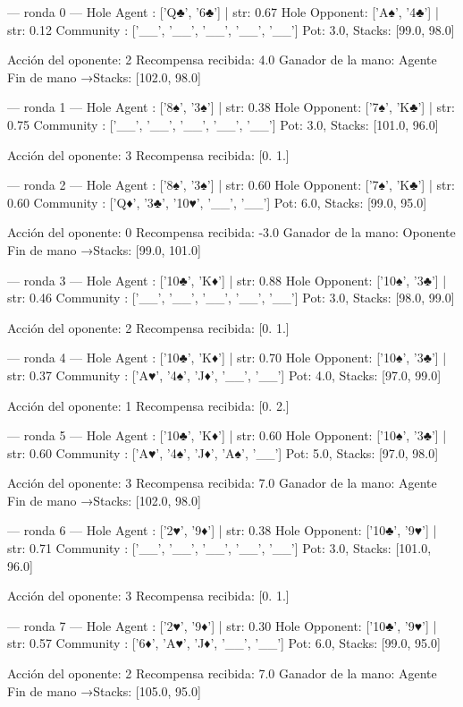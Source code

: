 
--- ronda 0 ---
Hole Agent : ['Q♣', '6♣'] | str: 0.67
Hole Opponent: ['A♠', '4♣'] | str: 0.12
Community  : ['__', '__', '__', '__', '__']
Pot: 3.0, Stacks: [99.0, 98.0]

Acción del oponente: 2
Recompensa recibida: 4.0
Ganador de la mano: Agente
Fin de mano →Stacks: [102.0, 98.0]


--- ronda 1 ---
Hole Agent : ['8♠', '3♠'] | str: 0.38
Hole Opponent: ['7♠', 'K♣'] | str: 0.75
Community  : ['__', '__', '__', '__', '__']
Pot: 3.0, Stacks: [101.0, 96.0]

Acción del oponente: 3
Recompensa recibida: [0. 1.]

--- ronda 2 ---
Hole Agent : ['8♠', '3♠'] | str: 0.60
Hole Opponent: ['7♠', 'K♣'] | str: 0.60
Community  : ['Q♦', '3♣', '10♥', '__', '__']
Pot: 6.0, Stacks: [99.0, 95.0]

Acción del oponente: 0
Recompensa recibida: -3.0
Ganador de la mano: Oponente
Fin de mano →Stacks: [99.0, 101.0]


--- ronda 3 ---
Hole Agent : ['10♣', 'K♦'] | str: 0.88
Hole Opponent: ['10♠', '3♣'] | str: 0.46
Community  : ['__', '__', '__', '__', '__']
Pot: 3.0, Stacks: [98.0, 99.0]

Acción del oponente: 2
Recompensa recibida: [0. 1.]

--- ronda 4 ---
Hole Agent : ['10♣', 'K♦'] | str: 0.70
Hole Opponent: ['10♠', '3♣'] | str: 0.37
Community  : ['A♥', '4♠', 'J♦', '__', '__']
Pot: 4.0, Stacks: [97.0, 99.0]

Acción del oponente: 1
Recompensa recibida: [0. 2.]

--- ronda 5 ---
Hole Agent : ['10♣', 'K♦'] | str: 0.60
Hole Opponent: ['10♠', '3♣'] | str: 0.60
Community  : ['A♥', '4♠', 'J♦', 'A♠', '__']
Pot: 5.0, Stacks: [97.0, 98.0]

Acción del oponente: 3
Recompensa recibida: 7.0
Ganador de la mano: Agente
Fin de mano →Stacks: [102.0, 98.0]


--- ronda 6 ---
Hole Agent : ['2♥', '9♦'] | str: 0.38
Hole Opponent: ['10♣', '9♥'] | str: 0.71
Community  : ['__', '__', '__', '__', '__']
Pot: 3.0, Stacks: [101.0, 96.0]

Acción del oponente: 3
Recompensa recibida: [0. 1.]

--- ronda 7 ---
Hole Agent : ['2♥', '9♦'] | str: 0.30
Hole Opponent: ['10♣', '9♥'] | str: 0.57
Community  : ['6♦', 'A♥', 'J♦', '__', '__']
Pot: 6.0, Stacks: [99.0, 95.0]

Acción del oponente: 2
Recompensa recibida: 7.0
Ganador de la mano: Agente
Fin de mano →Stacks: [105.0, 95.0]


